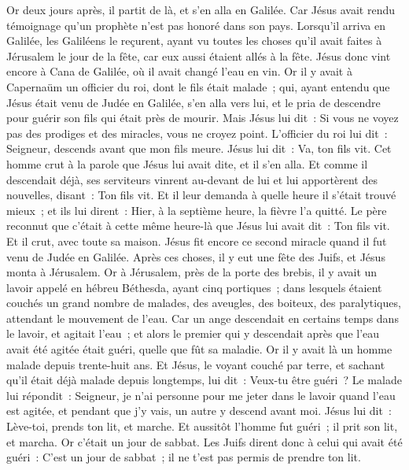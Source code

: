 \begin{multicols}{2}
Or deux jours après, il partit de là, et s'en alla en Galilée.
Car Jésus avait rendu témoignage qu'un prophète n'est pas honoré dans son pays.
Lorsqu'il arriva en Galilée, les Galiléens le reçurent, ayant vu toutes les choses qu'il avait faites à Jérusalem le jour de la fête, car eux aussi étaient allés à la fête.
Jésus donc vint encore à Cana de Galilée, où il avait changé l'eau en vin. Or il y avait à Capernaüm un officier du roi, dont le fils était malade~;
qui, ayant entendu que Jésus était venu de Judée en Galilée, s'en alla vers lui, et le pria de descendre pour guérir son fils qui était près de mourir.
Mais Jésus lui dit~: Si vous ne voyez pas des prodiges et des miracles, vous ne croyez point.
L'officier du roi lui dit~: Seigneur, descends avant que mon fils meure.
Jésus lui dit~: Va, ton fils vit. Cet homme crut à la parole que Jésus lui avait dite, et il s'en alla.
Et comme il descendait déjà, ses serviteurs vinrent au-devant de lui et lui apportèrent des nouvelles, disant~: Ton fils vit.
Et il leur demanda à quelle heure il s'était trouvé mieux~; et ils lui dirent~: Hier, à la septième heure, la fièvre l'a quitté.
Le père reconnut que c'était à cette même heure-là que Jésus lui avait dit~: Ton fils vit. Et il crut, avec toute sa maison.
Jésus fit encore ce second miracle quand il fut venu de Judée en Galilée.
\VerseOne{}Après ces choses, il y eut une fête des Juifs, et Jésus monta à Jérusalem.
Or à Jérusalem, près de la porte des brebis, il y avait un lavoir appelé en hébreu Béthesda, ayant cinq portiques~;
dans lesquels étaient couchés un grand nombre de malades, des aveugles, des boiteux, des paralytiques, attendant le mouvement de l'eau.
Car un ange descendait en certains temps dans le lavoir, et agitait l'eau~; et alors le premier qui y descendait après que l'eau avait été agitée était guéri, quelle que fût sa maladie.
Or il y avait là un homme malade depuis trente-huit ans.
Et Jésus, le voyant couché par terre, et sachant qu'il était déjà malade depuis longtemps, lui dit~: Veux-tu être guéri~?
Le malade lui répondit~: Seigneur, je n'ai personne pour me jeter dans le lavoir quand l'eau est agitée, et pendant que j'y vais, un autre y descend avant moi.
Jésus lui dit~: Lève-toi, prends ton lit, et marche.
Et aussitôt l'homme fut guéri~; il prit son lit, et marcha. Or c'était un jour de sabbat.
Les Juifs dirent donc à celui qui avait été guéri~: C'est un jour de sabbat~; il ne t'est pas permis de prendre ton lit.

\end{multicols}
